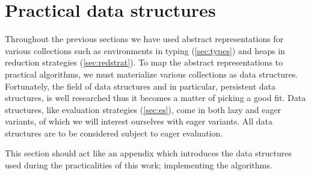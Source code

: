\chapter{Practical data structures}\label{sec:datastruct}
Throughout the previous sections we have used abstract representations for various collections such as environments in typing (\autoref{sec:types}) and heaps in reduction strategies (\autoref{sec:redstrat}).
To map the abstract representations to practical algorithms, we must materialize various collections as data structures.
Fortunately, the field of data structures and in particular, persistent data structures, is well researched thus it becomes a matter of picking a good fit.
Data structures, like evaluation strategies (\autoref{sec:es}), come in both lazy and eager variants, of which we will interest ourselves with eager variants.
All data structures are to be considered subject to eager evaluation.

This section should act like an appendix which introduces the data structures used during the practicalities of this work; implementing the algorithms.

\clearpage







%

